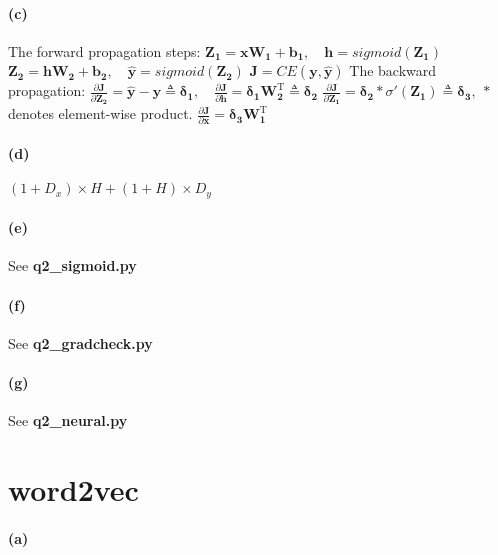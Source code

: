 \documentclass{article}
\begin{document}
\begin{spacing}{1.5}
\paragraph{(c)}
The forward propagation steps: \newline
$ \boldsymbol{Z_{1}}=\boldsymbol{xW_{1}}+\boldsymbol{b_{1}}, \quad
\boldsymbol{h}=sigmoid(\boldsymbol{Z_{1}})$ \newline
$ \boldsymbol{Z_{2}}=\boldsymbol{hW_{2}}+\boldsymbol{b_{2}}, \quad
\boldsymbol{\widehat{y}}=sigmoid(\boldsymbol{Z_{2}})$ \newline
$ \boldsymbol{J}=CE(\boldsymbol{y}, \boldsymbol{\widehat{y}}) $ \newline
The backward propagation: \newline
$ \frac{\partial \boldsymbol{J}}{\partial \boldsymbol{Z_2}}
=\boldsymbol{\widehat{y}}-\boldsymbol{y} \triangleq \boldsymbol{\delta_1}, \quad  
\frac{\partial \boldsymbol{J}}{\partial \boldsymbol{h}}
=\boldsymbol{\delta_1} \boldsymbol{W_2 ^ \mathrm{T}} \triangleq \boldsymbol{\delta_2}$ \newline
$ \frac{\partial \boldsymbol{J}}{\partial \boldsymbol{Z_1}}
=\boldsymbol{\delta_2} \ast \sigma'(\boldsymbol{Z_1})\triangleq \boldsymbol{\delta_3}, \ \ast$ denotes element-wise product. \newline
$ \frac{\partial \boldsymbol{J}}{\partial \boldsymbol{x}}
=\boldsymbol{\delta_3}\boldsymbol{W_1 ^ \mathrm{T}} $
\paragraph{(d)}
$ (1+D_x) \times H + (1+H) \times D_y $
\paragraph{(e)} See \textbf{q2\_sigmoid.py}
\paragraph{(f)} See \textbf{q2\_gradcheck.py}
\paragraph{(g)} See \textbf{q2\_neural.py}

\section{word2vec}
\paragraph{(a)}

\end{spacing}
\end{document}
